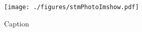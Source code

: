 
\begin{figure}[h]
	\centering
	\texttt{[image: ./figures/stmPhotoImshow.pdf]}
	\caption{Caption}
	\label{stm_ir_photo}
\end{figure}

